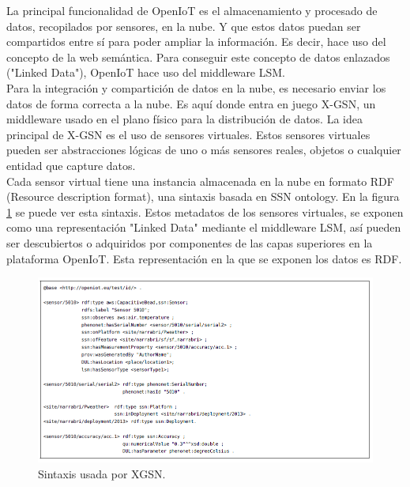 \documentclass[12pt, twoside]{book}
\begin{document}
La principal funcionalidad de OpenIoT es el almacenamiento y procesado de datos, recopilados por sensores, en la nube. Y que estos datos puedan ser compartidos entre sí para poder ampliar la información. Es decir, hace uso del concepto de la web semántica. Para conseguir este concepto de datos enlazados ("Linked Data"), OpenIoT hace uso del middleware LSM.\\

Para la integración y compartición de datos en la nube, es necesario enviar los datos de forma correcta a la nube. Es aquí donde entra en juego X-GSN, un middleware usado en el plano físico para la distribución de datos.
La idea principal de X-GSN es el uso de sensores virtuales. Estos sensores virtuales pueden ser abstracciones lógicas de uno o más sensores reales, objetos o cualquier entidad que capture datos.\\

Cada sensor virtual tiene una instancia almacenada en la nube en formato RDF (Resource description format), una sintaxis basada en SSN ontology. En la figura \ref{L304} se puede ver esta sintaxis. Estos metadatos de los sensores virtuales, se exponen como una representación "Linked Data" mediante el middleware LSM, así pueden ser descubiertos o adquiridos por componentes de las capas superiores en la plataforma OpenIoT. Esta representación en la que se exponen los datos es RDF.\\
\begin{figure}[H]
\centering
\includegraphics[scale=0.6]{images/semantica_xgsn}
\caption{Sintaxis usada por XGSN.}\label{L304}
\end{figure}
\end{document}
